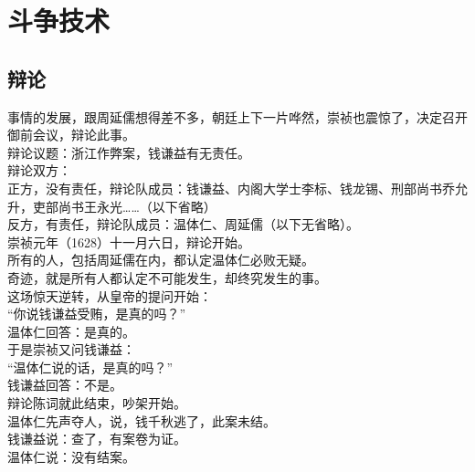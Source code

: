 \section{斗争技术}
\ifnum{}
	\begin{multicols}{\theparacolNo}
\fi
\subsection{辩论}
事情的发展，跟周延儒想得差不多，朝廷上下一片哗然，崇祯也震惊了，决定召开御前会议，辩论此事。\\

辩论议题：浙江作弊案，钱谦益有无责任。\\

辩论双方：\\

正方，没有责任，辩论队成员：钱谦益、内阁大学士李标、钱龙锡、刑部尚书乔允升，吏部尚书王永光……（以下省略）\\

反方，有责任，辩论队成员：温体仁、周延儒（以下无省略）。\\

崇祯元年（1628）十一月六日，辩论开始。\\

所有的人，包括周延儒在内，都认定温体仁必败无疑。\\

奇迹，就是所有人都认定不可能发生，却终究发生的事。\\

这场惊天逆转，从皇帝的提问开始：\\

“你说钱谦益受贿，是真的吗？”\\

温体仁回答：是真的。\\

于是崇祯又问钱谦益：\\

“温体仁说的话，是真的吗？”\\

钱谦益回答：不是。\\

辩论陈词就此结束，吵架开始。\\

温体仁先声夺人，说，钱千秋逃了，此案未结。\\

钱谦益说：查了，有案卷为证。\\

温体仁说：没有结案。\\


\end{multicols}
